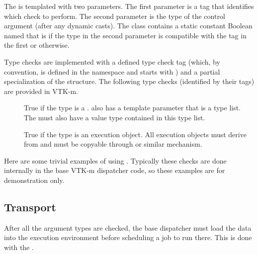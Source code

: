 The   is templated with two
parameters. The first parameter is a tag that identifies which check to
perform. The second parameter is the type of the control argument (after any
dynamic casts). The  class contains a static
constant Boolean named  that is  if the type
in the second parameter is compatible with the tag in the first or
 otherwise.

Type checks are implemented with a defined type check tag (which, by
convention, is defined in the \vtkmcontarg{} namespace and starts with
) and a partial specialization of the
 structure. The following type checks (identified by
their tags) are provided in VTK-m.

\begin{description}
\item[]  True if the
  type is a .  also
  has a template parameter that is a type list. The
   must also have a value type contained in
  this type list.
\item[]
   True if the type is an execution
  object. All execution objects must derive from
   and must be copyable through
   or similar mechanism.
\end{description}

Here are some trivial examples of using
. Typically these checks are done internally in
the base VTK-m dispatcher code, so these examples are for demonstration
only.



\subsection{Transport}
\label{sec:Transport}


After all the argument types are checked, the base dispatcher must load the
data into the execution environment before scheduling a job to run
there. This is done with the  .

